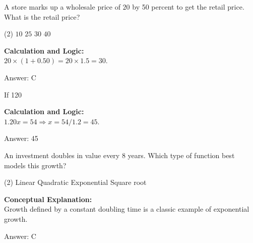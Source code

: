 \documentclass[11pt,paper=a4,answers]{exam}
\begin{document}
\begin{questions}
\vspace{60pt}

\question
A store marks up a wholesale price of $20$ by 50 percent to get the retail price. What is the retail price?
\begin{tasks}(2)
    \task $10$
    \task $25$
    \task $30$
    \task $40$
\end{tasks}

\begin{solution}
\textbf{Calculation and Logic:} \\
$20 \times (1 + 0.50) = 20 \times 1.5 = 30$.

\vspace{30pt}

Answer: \colorbox{yellow!100}{C}
\end{solution}

\vspace{60pt}

\question
If 120%

\begin{solution}
\textbf{Calculation and Logic:} \\
$1.20x = 54 \Rightarrow x = 54 / 1.2 = 45$.

\vspace{30pt}

Answer: \colorbox{yellow!100}{45}
\end{solution}

\vspace{60pt}

\question
An investment doubles in value every 8 years. Which type of function best models this growth?
\begin{tasks}(2)
    \task Linear
    \task Quadratic
    \task Exponential
    \task Square root
\end{tasks}

\begin{solution}
\textbf{Conceptual Explanation:} \\
Growth defined by a constant doubling time is a classic example of exponential growth.

\vspace{30pt}

Answer: \colorbox{yellow!100}{C}
\end{solution}


\end{questions}
\end{document}
